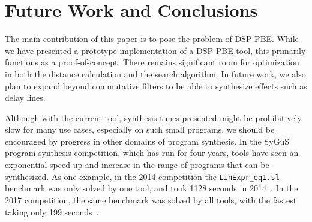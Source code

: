 \section{Future Work and Conclusions}

The main contribution of this paper is to pose the problem of DSP-PBE.
While we have presented a prototype implementation of a DSP-PBE tool, this primarily functions as a proof-of-concept.
There remains significant room for optimization in both the distance calculation and the search algorithm.
In future work, we also plan to expand beyond commutative filters to be able to synthesize effects such as delay lines.

Although with the current tool, synthesis times presented might be prohibitively slow for many use cases, especially on such small programs, we should be encouraged by progress in other domains of program synthesis.
In the SyGuS program synthesis competition, which has run for four years, tools have seen an exponential speed up and increase in the range of programs that can be synthesized.
As one example, in the 2014 competition the \texttt{LinExpr\_eq1.sl} benchmark was only solved by one tool, and took 1128 seconds in 2014~\cite{sygus2014}.
In the 2017 competition, the same benchmark was solved by all tools, with the fastest taking only 199 seconds~\cite{sygus2017}.
